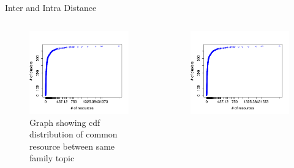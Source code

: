 \documentclass{beamer}
\begin{document}
\begin{frame}[plain]{Inter and Intra Distance}
\begin{columns}
  \begin{column}{5cm}
    \begin{figure}[H]
      \begin{center}
        \includegraphics[scale=0.3]{figures/intra_clustered_common.png}
      \end{center}
      \captionsetup{font=small}
      \caption{ Graph showing cdf distribution of common resource between same family topic}
    \end{figure}
  \end{column}
  \begin{column}{5cm}
    \begin{figure}[H]
      \begin{center}
        \includegraphics[scale=0.3]{figures/intra_clustered_common.png}

\end{center}
\end{figure}
\end{column}
\end{columns}
\end{frame}
\end{document}

